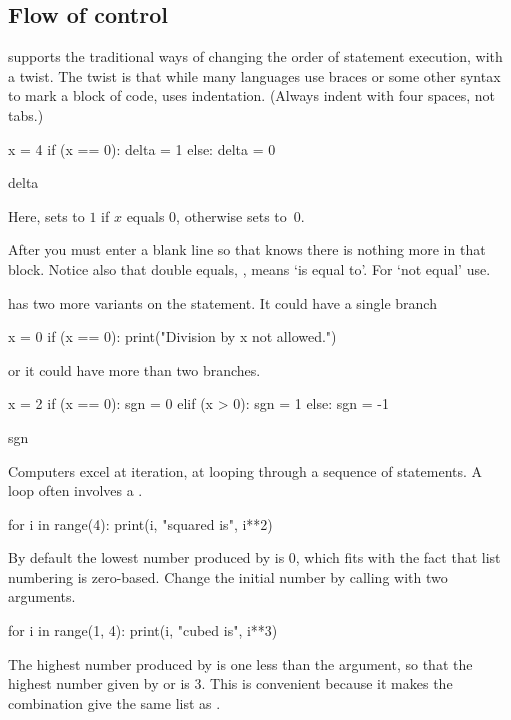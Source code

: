 \subsection{Flow of control}
\python{} supports the traditional ways of changing the order of 
statement execution, with a twist.
The twist is that while many languages use braces or some other syntax to
mark a block of code, \python{} uses indentation.
(Always indent with four spaces, not tabs.)
\begin{pythonconsole}
x = 4
if (x == 0):
    delta = 1
else:
    delta = 0

delta
\end{pythonconsole}
Here, \python{} sets  to  $1$ if $x$
equals $0$, otherwise \python{} sets  to~$0$. 

After  you must enter 
a blank line so that \python{} knows there is nothing more in that block.
Notice also that double equals, \inlinecode{==}, means `is equal to'. 
For `not equal' use\inlinecode{!=}. 

\python{} has two more variants on the  statement.
It could have a single branch
\begin{pythonconsole}
x = 0
if (x == 0):
    print("Division by x not allowed.")

\end{pythonconsole}
or it could have more than two branches.
\begin{pythonconsole}
x = 2
if (x == 0):
    sgn = 0
elif (x > 0):
    sgn = 1
else:
    sgn = -1

sgn
\end{pythonconsole}

Computers excel at iteration, at looping through a sequence of statements.
A  loop often involves a .
\begin{pythonconsole}
for i in range(4):
    print(i, "squared is", i**2)

\end{pythonconsole}
By default the lowest number produced by  is $0$, which
fits with the fact that list numbering is zero-based.
Change the initial number by calling  
with two arguments.
\begin{pythonconsole}
for i in range(1, 4):
    print(i, "cubed is", i**3)

\end{pythonconsole}
The highest number produced by  is one less than the 
argument, so that the highest number
given by  or  is $3$.
This is convenient because it makes the 
combination  give 
the same list as .

